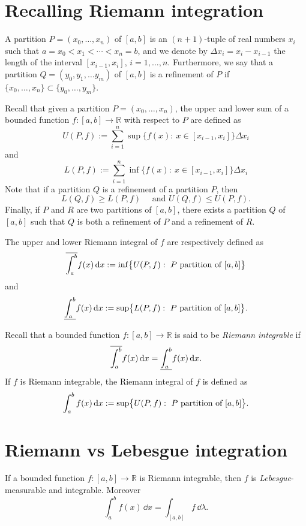 \section{Recalling Riemann integration}

\begin{definition}
A partition $P = (x_0, \dots, x_n)$ of $[a,b]$ is an $(n+1)$-tuple of real numbers $x_i$ such that $a = x_0 < x_1 < \cdots < x_n = b$, and we denote by $\Delta x_i = x_i-x_{i-1}$ the length of the interval $[x_{i-1},x_i]$, $i=1,\ldots,n$. Furthermore, we say that a partition $Q = (y_0, y_1, \dots y_m)$ of $[a,b]$ is a refinement of $P$ if $\{x_0,\dots, x_n\} \subset \{y_0, \dots, y_m\}$.
\end{definition}

Recall that given a partition $P = (x_0, \dots, x_n)$, the upper and lower sum of a bounded function $f:[a,b] \to \mathbb{R}$ with respect to $P$ are defined as
\[
U(P,f) := \sum_{i=1}^n \sup\bigl\{f(x) : \ x \in [x_{i-1},x_i] \bigr\} \Delta x_i
\]
and
\[
L(P,f) := \sum_{i=1}^n \inf\bigl\{f(x) : \ x \in [x_{i-1},x_i] \bigr\} \Delta x_i
\]
Note that if a partition $Q$ is a refinement of a partition $P$, then
\[
L(Q, f) \geq L(P,f) \quad \text{ and } U(Q,f) \leq U(P,f).
\]
Finally, if $P$ and $R$ are two partitions of $[a,b]$, there exists a partition $Q$ of $[a,b]$ such that $Q$ is both a refinement of $P$ and a refinement of $R$.

The upper and lower Riemann integral of $f$ are respectively defined as
\[
\overline{\int_a^b } f(x) \,\mathrm{d} x := \inf \bigl\{ U(P,f) : \ P \text{ partition of } [a,b] \bigr\}
\]
and
\[
\underline{\int_a^b } f(x) \,\mathrm{d} x:= \sup \bigl\{L(P,f) : \ P \text{ partition of } [a,b]  \bigr\}.
\]
\begin{definition}
Recall that a bounded function $f:[a,b] \to \mathbb{R}$ is said to be \emph{Riemann integrable} if 
\[
\overline{\int_a^b } f(x) \,\mathrm{d} x = \underline{\int_a^b } f(x) \,\mathrm{d} x.
\]
If $f$ is Riemann integrable, the Riemann integral of $f$ is defined as
\[
\int_a^b f(x) \,\mathrm{d} x := \sup \bigl\{  U(P, f) : \ P \text{ partition of } [a,b] \bigr\}.
\]
\end{definition}

\section{Riemann vs Lebesgue integration}

\begin{theorem}
If a bounded function $f: [a,b] \to \mathbb{R}$ is Riemann integrable, then $f$ is \emph{Lebesgue}-measurable and integrable. Moreover
\[
\int_a^b f(x) \,\dd x = \int_{[a,b]} f \,\dd \lambda.
\]
\end{theorem}

